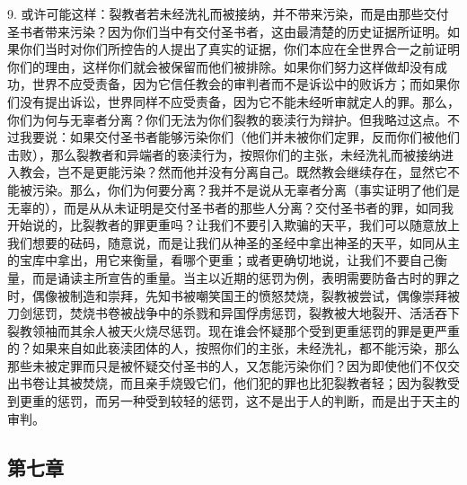 9. 或许可能这样：裂教者若未经洗礼而被接纳，并不带来污染，而是由那些交付圣书者带来污染？因为你们当中有交付圣书者，这由最清楚的历史证据所证明。如果你们当时对你们所控告的人提出了真实的证据，你们本应在全世界合一之前证明你们的理由，这样你们就会被保留而他们被排除。如果你们努力这样做却没有成功，世界不应受责备，因为它信任教会的审判者而不是诉讼中的败诉方；而如果你们没有提出诉讼，世界同样不应受责备，因为它不能未经听审就定人的罪。那么，你们为何与无辜者分离？你们无法为你们裂教的亵渎行为辩护。但我略过这点。不过我要说：如果交付圣书者能够污染你们（他们并未被你们定罪，反而你们被他们击败），那么裂教者和异端者的亵渎行为，按照你们的主张，未经洗礼而被接纳进入教会，岂不是更能污染？然而他并没有分离自己。既然教会继续存在，显然它不能被污染。那么，你们为何要分离？我并不是说从无辜者分离（事实证明了他们是无辜的），而是从从未证明是交付圣书者的那些人分离？交付圣书者的罪，如同我开始说的，比裂教者的罪更重吗？让我们不要引入欺骗的天平，我们可以随意放上我们想要的砝码，随意说，而是让我们从神圣的圣经中拿出神圣的天平，如同从主的宝库中拿出，用它来衡量，看哪个更重；或者更确切地说，让我们不要自己衡量，而是诵读主所宣告的重量。当主以近期的惩罚为例，表明需要防备古时的罪之时，偶像被制造和崇拜，先知书被嘲笑国王的愤怒焚烧，裂教被尝试，偶像崇拜被刀剑惩罚，焚烧书卷被战争中的杀戮和异国俘虏惩罚，裂教被大地裂开、活活吞下裂教领袖而其余人被天火烧尽惩罚。现在谁会怀疑那个受到更重惩罚的罪是更严重的？如果来自如此亵渎团体的人，按照你们的主张，未经洗礼，都不能污染，那么那些未被定罪而只是被怀疑交付圣书的人，又怎能污染你们？因为即使他们不仅交出书卷让其被焚烧，而且亲手烧毁它们，他们犯的罪也比犯裂教者轻；因为裂教受到更重的惩罚，而另一种受到较轻的惩罚，这不是出于人的判断，而是出于天主的审判。\par


\subsection{第七章}

